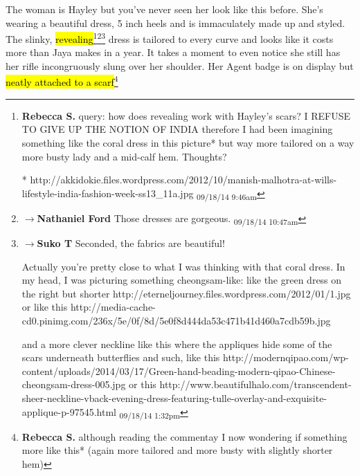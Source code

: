 The woman is Hayley but you've never seen her look like this before.  She's wearing a beautiful dress, 5 inch heels and is immaculately made up and styled. The slinky, \hl{revealing}\footnote{\textbf{Rebecca S. }query: how does revealing work with Hayley's scars? 
I REFUSE TO GIVE UP THE NOTION OF INDIA therefore I had been imagining something like the coral dress in this picture* but way more tailored on a way more busty lady and a mid-calf hem. 
Thoughts?

* http://akkidokie.files.wordpress.com/2012/10/manish-malhotra-at-wills-lifestyle-india-fashion-week-ss13\_11a.jpg \textsubscript{09/18/14 9:46am}}\footnote{$\rightarrow$\textbf{Nathaniel Ford }Those dresses are gorgeous. \textsubscript{09/18/14 10:47am}}\footnote{$\rightarrow$\textbf{Suko T }Seconded, the fabrics are beautiful!

Actually you're pretty close to what I was thinking with that coral dress.  In my head, I was picturing something cheongsam-like:
like the green dress on the right but shorter
http://eterneljourney.files.wordpress.com/2012/01/1.jpg
or like this
http://media-cache-cd0.pinimg.com/236x/5e/0f/8d/5e0f8d444da53c471b41d460a7cdb59b.jpg

and a more clever neckline like this where the appliques hide some of the scars underneath butterflies and such, like this
http://modernqipao.com/wp-content/uploads/2014/03/17/Green-hand-beading-modern-qipao-Chinese-cheongsam-dress-005.jpg 
or this
http://www.beautifulhalo.com/transcendent-sheer-neckline-vback-evening-dress-featuring-tulle-overlay-and-exquisite-applique-p-97545.html \textsubscript{09/18/14 1:32pm}} dress is tailored to every curve and looks like it costs more than Jaya makes in a year.  It takes a moment to even notice she still has her rifle incongruously slung over her shoulder.  Her Agent badge is on display but \hl{neatly attached to a scarf}\footnote{\textbf{Rebecca S. }although reading the commentay I now wondering if something more like this*  (again more tailored and more busty with slightly shorter hem)

}

